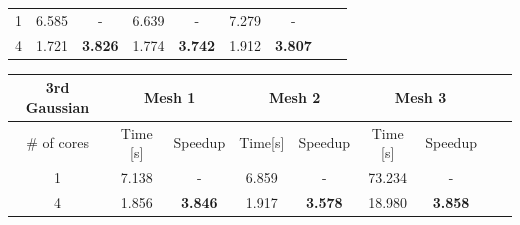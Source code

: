 \documentclass[8pt]{beamer}
\begin{document}
\begin{frame}
\begin{footnotesize}
\begin{center}
\begin{tabular}{|c|c|c|c|c|c|c|c|c|}
    \hline
    1 & 6.585 & - & 6.639 & - & 7.279 & - \\
    4 & 1.721 & \textbf{3.826} & 1.774 & \textbf{3.742} & 1.912 & \textbf{3.807} \\
    \hline
\end{tabular}
\end{center}
\begin{center}
\begin{tabular}{|c|c|c|c|c|c|c|c|c|} 
   \hline
    \textbf{3rd Gaussian}& \multicolumn{2}{|c|}{Mesh 1} & \multicolumn{2}{|c|}{Mesh 2} & \multicolumn{2}{|c|}{Mesh 3}\\
    \hline
    \# of cores & Time [s] & Speedup & Time[s] & Speedup & Time [s] & Speedup \\
    \hline
    1 & 7.138 & - & 6.859 & - & 73.234 & - \\
    4 & 1.856 & \textbf{3.846} & 1.917 & \textbf{3.578} & 18.980 & \textbf{3.858} \\
    \hline
\end{tabular}
\end{center}
\end{footnotesize}
\end{frame}
\end{document}
